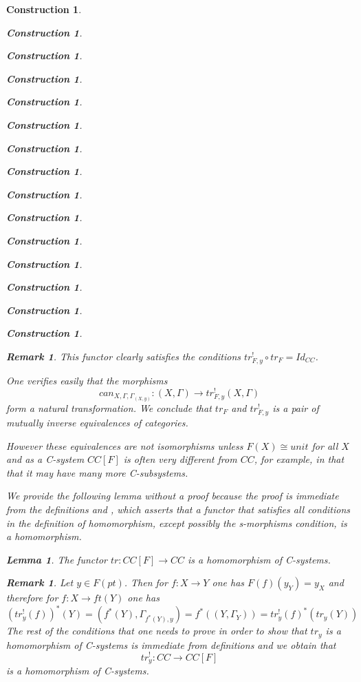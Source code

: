 \documentclass[12pt]{amsart}
\newtheorem{lemma}[proposition]{Lemma}
\newtheorem{remark}[proposition]{Remark}
\numberwithin{proposition}{subsection}
\newtheorem{construction}[proposition]{Construction}
\newcommand{\llabel}[1]{\label{#1}}
\newcommand{\sr}{\rightarrow}
\begin{document}
\begin{construction}
\begin{construction}
\begin{construction}
\begin{construction}
\begin{construction}
\begin{construction}
\begin{construction}
\begin{construction}
\begin{construction}
\begin{construction}
\begin{construction}
\begin{construction}
\begin{construction}
\begin{construction}
\begin{construction}
\begin{remark}
This functor clearly satisfies the conditions $tr^!_{F,y}\circ tr_F=Id_{CC}$.

One verifies easily that the morphisms 
%
$$can_{X,\Gamma,\Gamma_{(X,y)}}:(X,\Gamma)\sr tr^!_{F,y}(X,\Gamma)$$
%
form a natural transformation. We conclude that $tr_F$ and $tr^!_{F,y}$ is a
pair of mutually inverse equivalences of categories.

However these equivalences are not isomorphisms unless $F(X)\cong unit$ for all
$X$ and as a C-system $CC[F]$ is often very different from $CC$, for example,
in that that it may have many more C-subsystems.
\end{remark}
%
We provide the following lemma without a proof because the proof is immediate
from the definitions and \cite[Lemma 3.4]{Cfromauniverse}, which asserts that a
functor that satisfies all conditions in the definition of homomorphism,
except possibly the s-morphisms condition, is a homomorphism.
%
\begin{lemma}
\llabel{2015.08.22.l4}
The functor $tr:CC[F]\sr CC$ is a homomorphism of C-systems.
\end{lemma}
%
\begin{remark}\rm
\llabel{2015.08.22.rem1} 
Let $y\in F(pt)$. Then for $f:X\sr Y$ one has $F(f)(y_{Y})=y_X$ and therefore for $f:X\sr ft(Y)$ one has
%
$$(tr^!_{y}(f))^*(Y)=(f^*(Y),\Gamma_{f^*(Y),y})=f^*((Y,\Gamma_Y))=tr^!_y(f)^*(tr_y(Y))$$
%
The rest of the conditions that one needs to prove in order to show that $tr_y$
is a homomorphism of C-systems is immediate from definitions and we obtain that
%
$$tr^!_y:CC\sr CC[F]$$
%
is a homomorphism of C-systems.  
\end{remark}
%


\end{construction}
\end{construction}
\end{construction}
\end{construction}
\end{construction}
\end{construction}
\end{construction}
\end{construction}
\end{construction}
\end{construction}
\end{construction}
\end{construction}
\end{construction}
\end{construction}
\end{construction}
\end{document}
